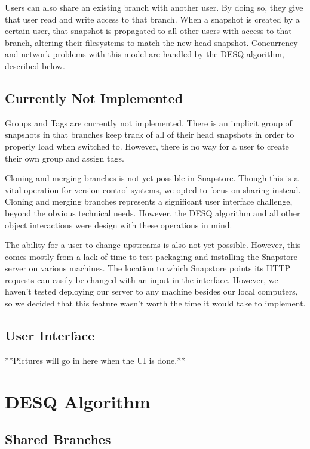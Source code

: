 Users can also share an existing branch with another user. By doing so, they give that user read and write access to that branch. When a snapshot is created by a certain user, that snapshot is propagated to all other users with access to that branch, altering their filesystems to match the new head snapshot. Concurrency and network problems with this model are handled by the DESQ algorithm, described below.

\subsection{Currently Not Implemented}

Groups and Tags are currently not implemented. There is an implicit group of snapshots in that branches keep track of all of their head snapshots in order to properly load when switched to. However, there is no way for a user to create their own group and assign tags.

Cloning and merging branches is not yet possible in Snapstore. Though this is a vital operation for version control systems, we opted to focus on sharing instead. Cloning and merging branches represents a significant user interface challenge, beyond the obvious technical needs. However, the DESQ algorithm and all other object interactions were design with these operations in mind.

The ability for a user to change upstreams is also not yet possible. However, this comes mostly from a lack of time to test packaging and installing the Snapstore server on various machines. The location to which Snapstore points its HTTP requests can easily be changed with an input in the interface. However, we haven't tested deploying our server to any machine besides our local computers, so we decided that this feature wasn't worth the time it would take to implement.

\subsection{User Interface}

**Pictures will go in here when the UI is done.**

\section{DESQ Algorithm}

\subsection{Shared Branches}

